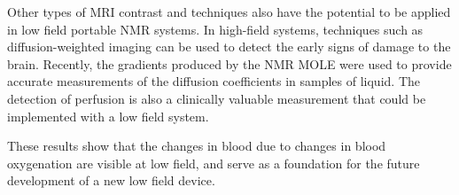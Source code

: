 Other types of MRI contrast and techniques also have the potential to be applied in low field portable NMR systems.
In high-field systems, techniques such as diffusion-weighted imaging can be used to detect the early signs of damage to the brain.
Recently, the gradients produced by the NMR MOLE were used to provide accurate measurements of the diffusion coefficients in samples of liquid.
The detection of perfusion is also a clinically valuable measurement that could be implemented with a low field system.

These results show that the \Ttwo changes in blood due to changes in blood oxygenation are visible at low field, and serve as a foundation for the future development of a new low field device.
